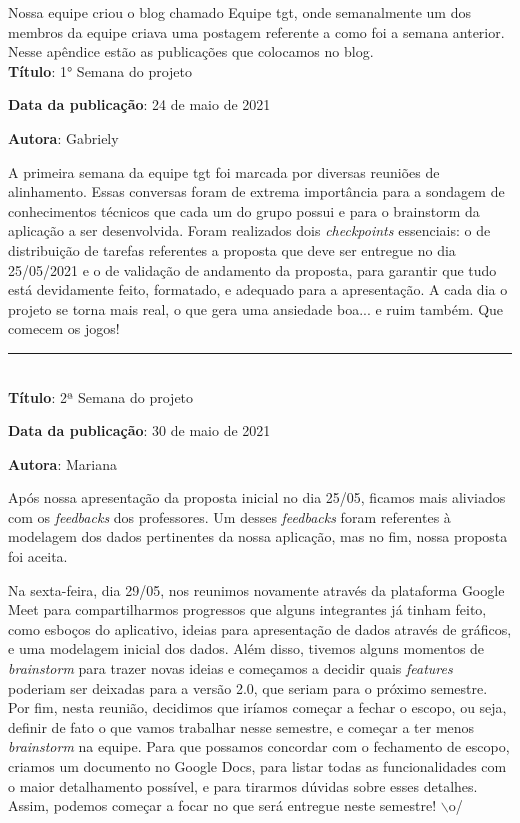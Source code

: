 Nossa equipe criou o blog chamado Equipe \gls{tgt}, onde semanalmente um dos membros da equipe criava uma postagem referente a como foi a semana anterior. Nesse apêndice estão as publicações que colocamos no blog.\\

\textbf{Título}: 1° Semana do projeto

\textbf{Data da publicação}: 24 de maio de 2021

\textbf{Autora}: Gabriely

A primeira semana da equipe \gls{tgt} foi marcada por diversas reuniões de alinhamento. Essas conversas foram de extrema importância para a sondagem de conhecimentos técnicos que cada um do grupo possui e para o brainstorm da aplicação a ser desenvolvida. Foram realizados dois \textit{checkpoints} essenciais: o de distribuição de tarefas referentes a proposta que deve ser entregue no dia 25/05/2021 e o de validação de andamento da proposta, para garantir que tudo está devidamente feito, formatado, e adequado para a apresentação. A cada dia o projeto se torna mais real, o que gera uma ansiedade boa... e ruim também. Que comecem os jogos! \\

\protect\rule{13cm}{.5pt}
\\

\textbf{Título}: 2ª Semana do projeto

\textbf{Data da publicação}: 30 de maio de 2021

\textbf{Autora}: Mariana

Após nossa apresentação da proposta inicial no dia 25/05, ficamos mais aliviados com os \textit{feedbacks} dos professores. Um desses \textit{feedbacks} foram referentes à modelagem dos dados pertinentes da nossa aplicação, mas no fim, nossa proposta foi aceita.

Na sexta-feira, dia 29/05, nos reunimos novamente através da plataforma Google Meet para compartilharmos progressos que alguns integrantes já tinham feito, como esboços do aplicativo, ideias para apresentação de dados através de gráficos, e uma modelagem inicial dos dados. Além disso, tivemos alguns momentos de \textit{brainstorm} para trazer novas ideias e começamos a decidir quais \textit{features} poderiam ser deixadas para a versão 2.0, que seriam para o próximo semestre. Por fim, nesta reunião, decidimos que iríamos começar a fechar o escopo, ou seja, definir de fato o que vamos trabalhar nesse semestre, e começar a ter menos \textit{brainstorm} na equipe. Para que possamos concordar com o fechamento de escopo, criamos um documento no Google Docs, para listar todas as funcionalidades com o maior detalhamento possível, e para tirarmos dúvidas sobre esses detalhes. Assim, podemos começar a focar no que será entregue neste semestre! $\backslash$o/


